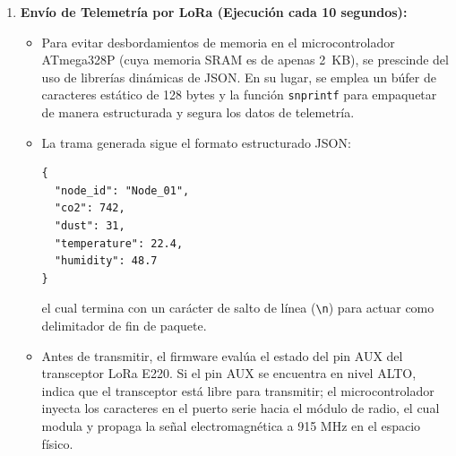 \begin{enumerate}
\begin{itemize}
\begin{equation}
                        u_{\text{final}}(k) = \max\left( u_{\text{CO}_2}(k),\, u_{\text{temp}}(k),\, u_{\text{hum}}(k) \right)
                    \end{equation}
              \item \textbf{Accionamiento del Actuador:} El valor $u_{\text{final}}(k)$ se mapea y escribe directamente en el registro de comparación del Timer 1 (\texttt{OCR1A}), modulando el ciclo de trabajo del MOSFET.
              \item \textbf{Lectura de Velocidad Real:} Utilizando la función \texttt{pulseIn()} en el pin D6, se mide la duración del pulso alto y bajo de la señal TACH del ventilador. Con base en el periodo obtenido y asumiendo 2 pulsos por revolución, se calculan las RPM reales de giro del motor.
          \end{itemize}

    \item \textbf{Envío de Telemetría por LoRa (Ejecución cada 10 segundos):}
          \begin{itemize}
              \item Para evitar desbordamientos de memoria en el microcontrolador ATmega328P (cuya memoria SRAM es de apenas 2~KB), se prescinde del uso de librerías dinámicas de JSON. En su lugar, se emplea un búfer de caracteres estático de 128 bytes y la función \texttt{snprintf} para empaquetar de manera estructurada y segura los datos de telemetría.
              \item La trama generada sigue el formato estructurado JSON:
                    \begin{verbatim}
{
  "node_id": "Node_01",
  "co2": 742,
  "dust": 31,
  "temperature": 22.4,
  "humidity": 48.7
}
                    \end{verbatim}
                    el cual termina con un carácter de salto de línea (\texttt{\textbackslash n}) para actuar como delimitador de fin de paquete.
              \item Antes de transmitir, el firmware evalúa el estado del pin AUX del transceptor LoRa E220. Si el pin AUX se encuentra en nivel ALTO, indica que el transceptor está libre para transmitir; el microcontrolador inyecta los caracteres en el puerto serie hacia el módulo de radio, el cual modula y propaga la señal electromagnética a 915 MHz en el espacio físico.
          \end{itemize}
\end{enumerate}



